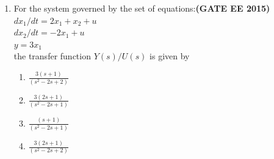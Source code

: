 \documentclass[a4paper,12pt]{exam}
\theoremstyle{remark}
\begin{document}
\begin{enumerate}
\item For the system governed by the set of equations:\hfill{\textbf{(GATE EE 2015)}}\\
$dx_1/dt = 2x_1 + x_2 + u$\\
$dx_2/dt = -2x_1 + u$\\
$y = 3x_1$\\
the transfer function $Y(s)/U(s)$ is given by
\begin{multicols}{2}
    \begin{enumerate}
        \item $\frac{3(s+1)}{(s^2 - 2s + 2)}$
        \item $\frac{3(2s+1)}{(s^2 - 2s + 1)}$
        \item $\frac{(s+1)}{(s^2 - 2s + 1)}$
        \item $\frac{3(2s+1)}{(s^2 - 2s + 2)}$
    \end{enumerate}
\end{multicols}


 \end{enumerate}
\end{document}
